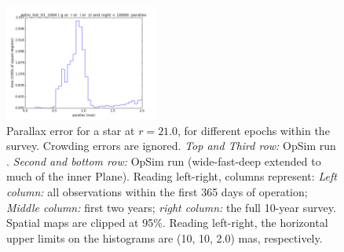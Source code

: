\begin{figure}[ht]
\begin{center}
  \includegraphics[width=2.0in]{./figs/milkyway/astromPanels/MW_Astrom_paError_wfdPlane_10y_hst.png}
  \end{center}
  \caption{Parallax error for a star at $r=21.0$, for different epochs within the survey. Crowding errors are ignored. {\it Top and Third row:} OpSim run . {\it Second and bottom row:} OpSim run  (wide-fast-deep extended to much of the inner Plane). Reading left-right, columns represent: {\it Left column:} all observations within the first 365 days of operation; {\it Middle column:} first two years; {\it right column:} the full 10-year survey. Spatial maps are clipped at 95\%.  Reading left-right, the horizontal upper limits on the histograms are (10, 10, 2.0) mas, respectively.}
  \label{fig_astrom_ByTime_paError}
\end{figure}

